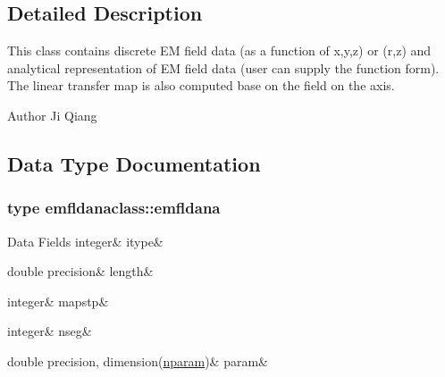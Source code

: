 \subsection{Detailed Description}
This class contains discrete EM field data (as a function of x,y,z) or (r,z) and analytical representation of EM field data (user can supply the function form). The linear transfer map is also computed base on the field on the axis. 

\begin{DoxyAuthor}{Author}
Ji Qiang 
\end{DoxyAuthor}


\subsection{Data Type Documentation}
\label{structemfldanaclass_1_1emfldana}
\subsubsection{type emfldanaclass\+::emfldana}
\begin{DoxyFields}{Data Fields}
\mbox{\label{namespaceemfldanaclass_a0f9482a746a37ef5287bb0b990c4244c}} 
integer&
itype&
\\
\hline

\mbox{\label{namespaceemfldanaclass_a94ad15c988b1d3fd9a7eb2902230b501}} 
double precision&
length&
\\
\hline

\mbox{\label{namespaceemfldanaclass_a4db12b7d942f212750921af22cc57a48}} 
integer&
mapstp&
\\
\hline

\mbox{\label{namespaceemfldanaclass_a9c550d5110930bddd92a57c1d9809e66}} 
integer&
nseg&
\\
\hline

\mbox{\label{namespaceemfldanaclass_a5d95e09d4f314af58ac2b9b0ecbdaa94}} 
double precision, dimension(\mbox{\hyperlink{namespaceemfldanaclass_a3ce28adb644b4d35b7f3e9713a275828}{nparam}})&
param&
\\
\hline

\end{DoxyFields}


